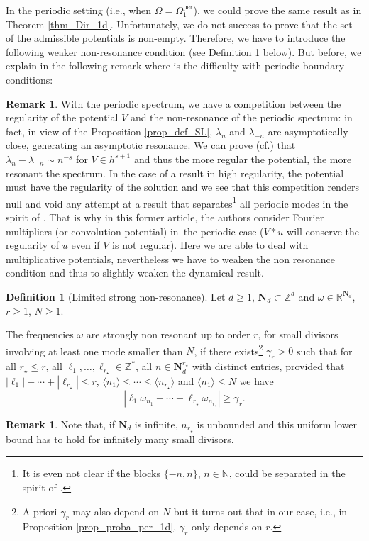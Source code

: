 \documentclass[11pt]{article}
\newcommand{\ie}{i.e.,\xspace}
\newcommand{\cf}{cf.\xspace}
\theoremstyle{definition}
\newtheorem{definition}[theorem]{Definition}
\newtheorem{remark}[theorem]{Remark}
\begin{document}
In the periodic setting (\ie when $\Omega= \Omega_1^{\mathrm{per}}$), we could prove the same result as in Theorem \ref{thm_Dir_1d}. Unfortunately, we do not success to prove that the set of the admissible potentials is non-empty. Therefore, we have to introduce the following weaker non-resonance condition (see Definition \ref{def_SNR_lim} below). But before,
we explain in the following remark where is the difficulty with periodic boundary conditions:
\begin{remark}\label{rk:per}
With the periodic spectrum, we have a competition between the regularity of the potential $V$ and the non-resonance of the periodic spectrum: in fact, in view of the Proposition \ref{prop_def_SL}, $\lambda_n$ and $\lambda_{-n}$ are asymptotically close, generating an asymptotic resonance. We can prove (\cf \cite{Mar86}) that $\lambda_n\!-\!\lambda_{-n}\!\sim\! n^{-s}$ for \hbox{$V\!\in\! h^{s+1}$} and thus the more regular the potential, the more resonant the spectrum. In the case of a result in high regularity, the potential must have the regularity of the solution and we see that this competition renders null and void any attempt at a result that separates\footnote{It is even not clear if the blocks $\{-n,n\}$, $n\in \mathbb{N}$, could be separated in the spirit of \cite{BDGS07}.} all periodic modes in the spirit of \cite{BG06}. That is why in this former article, the authors consider Fourier multipliers (or convolution potential) in~the peri\-odic case ($V*u$ will conserve the regularity of $u$ even if $V$ is not regular). Here we are able to deal with multiplicative potentials, nevertheless we have to weaken the non resonance condition and thus to slightly weaken the dynamical result.
\end{remark}
\begin{definition}[Limited strong non-resonance] \label{def_SNR_lim} Let $d\!\geq\! 1$, $\mathbf{N}_d \!\subset\! \mathbb{Z}^d$ and $\omega \!\in\! \mathbb{R}^{\mathbf{N}_d}$, $r\geq 1$, $N \geq 1$.

The frequencies $\omega$ are strongly non resonant up to order $r$, for small divisors involving at least one mode smaller than $N$, if there exists\footnote{A priori $\gamma_r$ may also depend on $N$ but it turns out that in our case, \ie in Proposition \ref{prop_proba_per_1d}, $\gamma_r$ only depends on $r$.} $\gamma_r>0$ such that for all $r_\star \leq r$, all $\ell_1,\dots,\ell_{r_\star} \in \mathbb{Z}^*$, all $n\in \mathbf{N}_d^{r_\star}$ with distinct entries, provided that $|\ell_1|+\cdots+|\ell_{r_\star}| \leq r$, $\langle n_1 \rangle \leq \cdots \leq \langle n_{r_\star} \rangle$ and $\langle n_1 \rangle\leq N$ we have
\[
|\ell_1 \omega_{n_1} + \cdots + \ell_{r_\star} \omega_{n_{r_\star}} | \geq \gamma_r.
\]
\end{definition}
\begin{remark}
Note that, if $\mathbf{N}_d$ is infinite, $n_{r_\star}$ is unbounded and this uniform lower bound has to hold for infinitely many small divisors.
\end{remark}
\end{document}

